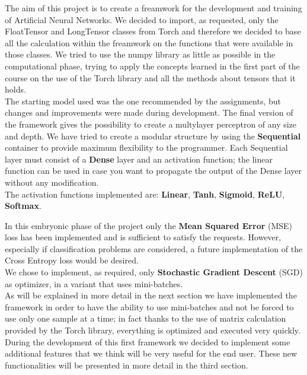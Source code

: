 The aim of this project is to create a freamwork for the development and training of Artificial Neural Networks. We decided to import, as requested, only the FloatTensor and LongTensor classes from Torch and therefore we decided to base all the calculation within the freamwork on the functions that were available in those classes. We tried to use the numpy library as little as possible in the computational phase, trying to apply the concepts learned in the first part of the course on the use of the Torch library and all the methods about tensors that it holds.\\
The starting model used was the one recommended by the assignments, but changes and improvements were made during development. The final version of the framework gives the possibility to create a multylayer perceptron of any size and depth. We have tried to create a modular structure by using the \textbf{Sequential} container to provide maximum flexibility to the programmer. Each Sequential layer must consist of a \textbf{Dense} layer and an activation function; the linear function can be used in case you want to propagate the output of the Dense layer without any modification. \\
The activation functions implemented are: \textbf{Linear}, \textbf{Tanh}, \textbf{Sigmoid}, \textbf{ReLU}, \textbf{Softmax}. \\
\begin{comment}
\begin{itemize}
	\item Linear
	\item Tanh
	\item Sigmoid
	\item Relu
	\item Softmax
\end{itemize}
\end{comment}
In this embryonic phase of the project only the \textbf{Mean Squared Error} (MSE) loss has been implemented and is sufficient to satisfy the requests. However, especially if classification problems are considered, a future implementation of the Cross Entropy loss would be desired. \\
We chose to implement, as required, only \textbf{Stochastic Gradient Descent} (SGD) as optimizer, in a variant that uses mini-batches. \\
As will be explained in more detail in the next section we have implemented the framework in order to have the ability to use mini-batches and not be forced to use only one sample at a time; in fact thanks to the use of matrix calculation provided by the Torch library, everything is optimized and executed very quickly. \\
During the development of this first framework we decided to implement some additional features that we think will be very useful for the end user. These new functionalities will be presented in more detail in the third section.
